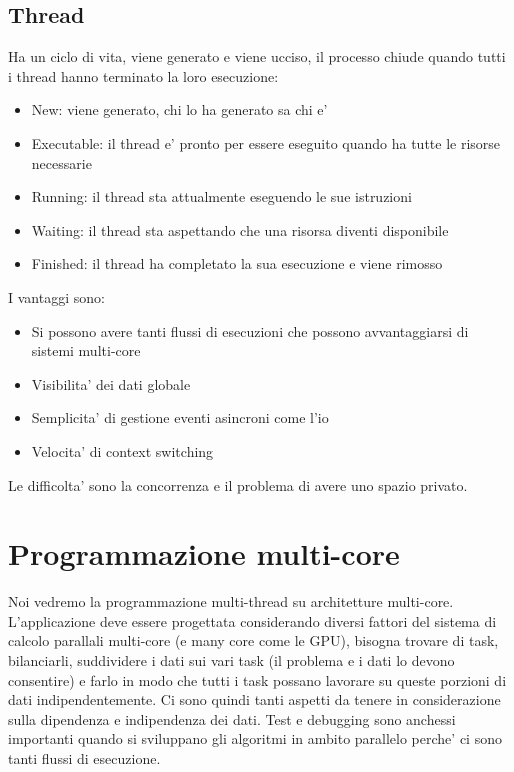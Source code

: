 \subsection{Thread}
Ha un ciclo di vita, viene generato e viene ucciso, il processo chiude quando tutti i thread hanno terminato la loro esecuzione:
\begin{itemize}
    \item New: viene generato, chi lo ha generato sa chi e' 
    \item Executable: il thread e' pronto per essere eseguito quando ha tutte le risorse necessarie
    \item Running: il thread sta attualmente eseguendo le sue istruzioni
    \item Waiting: il thread sta aspettando che una risorsa diventi disponibile
    \item Finished: il thread ha completato la sua esecuzione e viene rimosso
\end{itemize}

I vantaggi sono:
\begin{itemize}
    \item Si possono avere tanti flussi di esecuzioni che possono avvantaggiarsi di sistemi multi-core
    \item Visibilita' dei dati globale
    \item Semplicita' di gestione eventi asincroni come l'io 
    \item Velocita' di context switching
\end{itemize}

Le difficolta' sono la concorrenza e il problema di avere uno spazio privato.

\section{Programmazione multi-core}
Noi vedremo la programmazione multi-thread su architetture multi-core. L'applicazione deve essere progettata considerando diversi fattori del sistema di calcolo parallali multi-core (e many core come le GPU), bisogna trovare di task, bilanciarli, suddividere i dati sui vari task (il problema e i dati lo devono consentire) e farlo in modo che tutti i task possano lavorare su queste porzioni di dati indipendentemente. Ci sono quindi tanti aspetti da tenere in considerazione sulla dipendenza e indipendenza dei dati. Test e debugging sono anchessi importanti quando si sviluppano gli algoritmi in ambito parallelo perche' ci sono tanti flussi di esecuzione.

